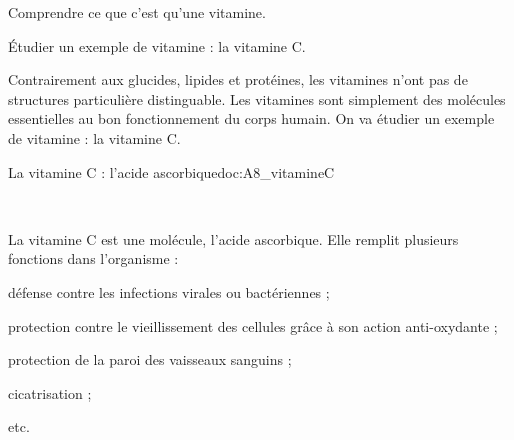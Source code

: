 \tetePremStssStru


\begin{objectifs}
  \item Comprendre ce que c'est qu'une vitamine.
  \item Étudier un exemple de vitamine : la vitamine C.
\end{objectifs}

\begin{contexte}
  Contrairement aux glucides, lipides et protéines, les vitamines n'ont pas de structures particulière distinguable.
  Les vitamines sont simplement des molécules essentielles au bon fonctionnement du corps humain.
  On va étudier un exemple de vitamine : la vitamine C.

\end{contexte}



\begin{doc}{La vitamine C : l'acide ascorbique}{doc:A8_vitamineC}
  \begin{center}
    \\[4pt]
    
  \end{center}
  La vitamine C est une molécule, l'acide ascorbique. 
  Elle remplit plusieurs fonctions dans l'organisme :
  \begin{listePoints}
    \item défense contre les infections virales ou bactériennes ;
    \item protection contre le vieillissement des cellules grâce à son action anti-oxydante ;
    \item protection de la paroi des vaisseaux sanguins ;
    \item cicatrisation ;
    \item etc.
  \end{listePoints}
\end{doc}


\numeroQuestion

\mesure
